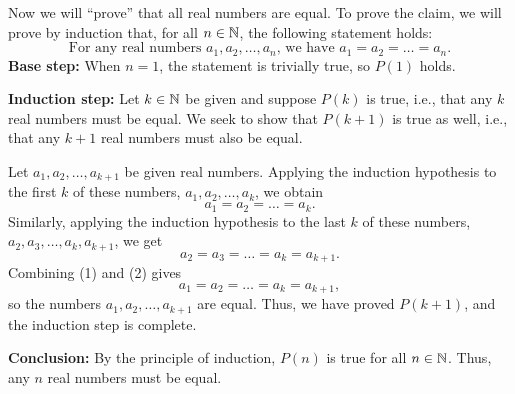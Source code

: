 \begin{example}\label{example:induction:fall2}
Now we will ``prove'' that all real numbers are equal. To prove the claim, we will prove by induction that, for all $n\in\mathbb{N}$,
the following statement holds:
\[
\text{For any real numbers $a_1,a_2,\dots, a_n$, we have $a_1=a_2=\dots=a_n$.}
\tag{$P(n)$}
\]
\textbf{Base step:} When $n=1$, the statement is trivially true, so $P(1)$
holds.  

\textbf{Induction step:} 
Let $k\in\mathbb{N}$ be given and suppose 
$P(k)$ is true, i.e., that any $k$ real numbers must be equal.
We seek to show that $P(k+1)$  is true as well,
i.e., that any $k+1$ real numbers must also be equal.

Let $a_1,a_2,\dots,a_{k+1}$ be given real numbers.  Applying the induction
hypothesis to the first $k$ of these numbers, $a_1,a_2,\dots,a_k$, we obtain
\[
\tag{1}
a_1=a_2=\dots=a_k.
\]
Similarly, applying the induction hypothesis to the last $k$ of these numbers, 
$a_2,a_3,\dots,a_k,a_{k+1}$, we get
\[
\tag{2}
a_2=a_3=\dots=a_k=a_{k+1}.
\]
Combining (1) and (2) gives
\[
\tag{3}
a_1=a_2=\dots=a_k=a_{k+1},
\]
so the numbers $a_1,a_2,\dots,a_{k+1}$ are equal.
Thus, we have proved $P(k+1)$, and the induction step is complete. 

\textbf{Conclusion:} By the principle of induction, 
$P(n)$  is true for all $n\in\mathbb{N}$. Thus, any $n$ real numbers must be equal.
\end{example}

%


